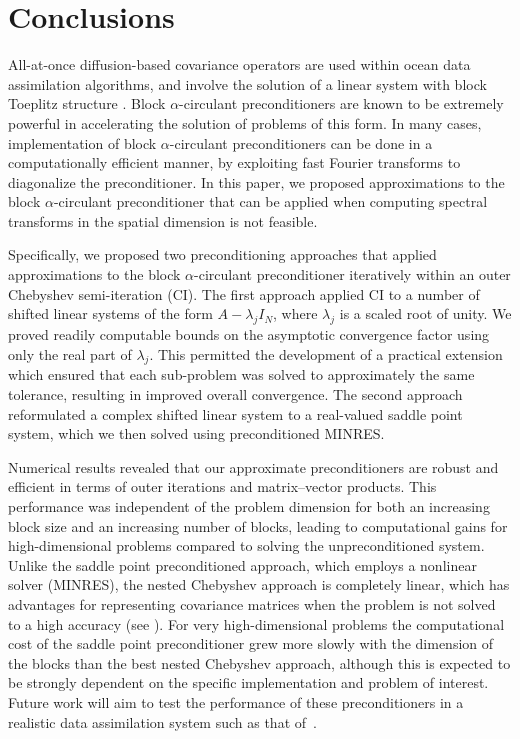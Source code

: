 \documentclass{article}
\newcommand{\sizeA}{N}
\theoremstyle{definition}
\begin{document}
{		
		\section{Conclusions} \label{sec:Conclusions}
		All-at-once diffusion-based covariance operators are used within ocean data assimilation algorithms, and involve the solution of a linear system with block Toeplitz structure \cite{weaver2018time}. Block $\alpha$-circulant preconditioners are known to be extremely powerful in accelerating the solution of problems of this form. In many cases, implementation of block $\alpha$-circulant preconditioners can be done in a computationally efficient manner, by exploiting fast Fourier transforms to diagonalize the preconditioner.  
		In this paper, we proposed approximations to the block $\alpha$-circulant preconditioner that can  be applied when computing spectral transforms in the spatial dimension is not feasible.
		
		Specifically, we proposed two preconditioning approaches that applied approximations to the block $\alpha$-circulant preconditioner iteratively within an outer Chebyshev semi-iteration (CI). The first approach applied CI to a number of shifted linear systems of the form $A-\lambda_j I_\sizeA$, where $\lambda_j$ is a scaled root of unity. We proved readily computable bounds on the asymptotic convergence factor using only the real part of $\lambda_j$. This permitted the development of a practical extension which ensured {{that}} each sub-problem was solved to approximately the same tolerance, resulting in improved overall convergence. The second approach reformulated a complex shifted linear system to a real-valued saddle point system, which we then solved using preconditioned MINRES.
		
		Numerical results revealed that our approximate preconditioners  are  robust and efficient in terms of outer iterations and matrix--vector products. This performance was independent of the problem dimension for both an increasing block size and an increasing number of blocks, leading to computational gains for high-dimensional problems compared to solving the unpreconditioned system. Unlike the saddle point preconditioned approach, which employs a nonlinear solver (MINRES), the nested Chebyshev approach is completely  linear, which has advantages for representing covariance matrices when the problem is not solved to a high accuracy (see \cite{weaver_correlation_2016,weaver2018time}). For very high-dimensional problems the computational cost of the saddle point preconditioner grew more slowly with the dimension of the blocks than the best nested Chebyshev approach, although this is expected to be strongly dependent on the specific implementation and problem of interest.
		Future work will aim to test the performance of these preconditioners in a realistic data assimilation system such as that of~\cite{Chrust_2025}. 
		
}
\end{document}
